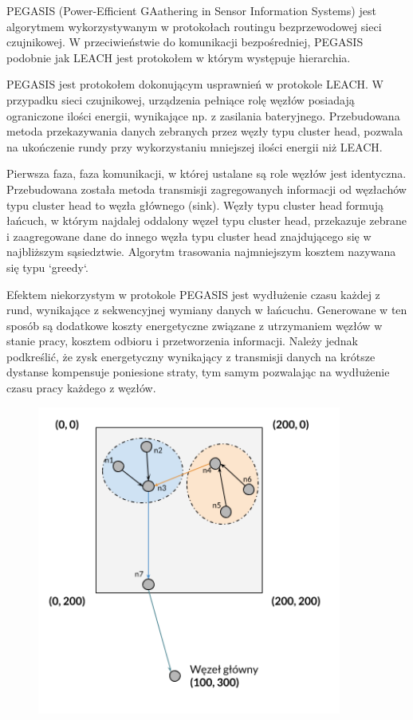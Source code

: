 \documentclass[a4paper,12pt,twoside,openany]{report}
\begin{document}
PEGASIS (Power-Efficient GAathering in Sensor Information Systems) jest algorytmem wykorzystywanym w protokołach routingu bezprzewodowej sieci czujnikowej.
W przeciwieństwie do komunikacji bezpośredniej, PEGASIS podobnie jak LEACH jest protokołem w którym występuje hierarchia.

PEGASIS jest protokołem dokonującym usprawnień w protokole LEACH. W przypadku sieci czujnikowej, urządzenia pełniące rolę węzłów posiadają ograniczone ilości energii, wynikające np. z zasilania bateryjnego.
Przebudowana metoda przekazywania danych zebranych przez węzły typu cluster head, pozwala na ukończenie rundy przy wykorzystaniu mniejszej ilości energii niż LEACH.

Pierwsza faza, faza komunikacji, w której ustalane są role węzłów jest identyczna. Przebudowana została metoda transmisji zagregowanych informacji od węzłachów typu cluster head to węzła głównego (sink).
Węzły typu cluster head formują łańcuch, w którym najdalej oddalony węzeł typu cluster head, przekazuje zebrane i zaagregowane dane do innego węzła typu cluster head znajdującego się w najbliższym 
sąsiedztwie. Algorytm trasowania najmniejszym kosztem nazywana się typu `greedy`. 

Efektem niekorzystym w protokole PEGASIS jest wydłużenie czasu każdej z rund, wynikające z sekwencyjnej wymiany danych w łańcuchu.
Generowane w ten sposób są dodatkowe koszty energetyczne związane z utrzymaniem węzłów w stanie pracy, kosztem odbioru i przetworzenia informacji.
Należy jednak podkreślić, że zysk energetyczny wynikający z transmisji danych na krótsze dystanse kompensuje poniesione straty, tym samym pozwalając na wydłużenie czasu pracy każdego z węzłów.

\begin{figure}[H]
 \centering
 \includegraphics[width=10cm]{images/komunikacja_pegasis.png} 
\end{figure}
\end{document}
